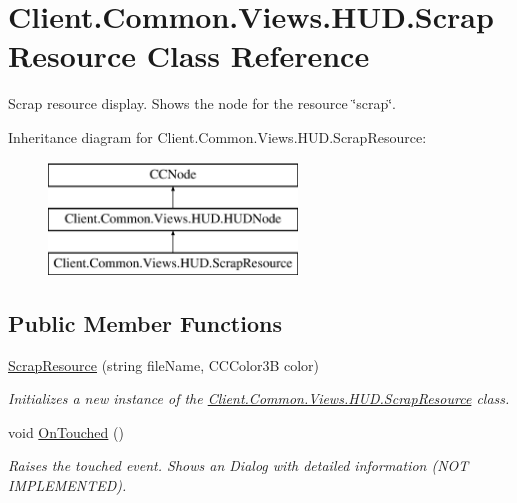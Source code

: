 \hypertarget{classClient_1_1Common_1_1Views_1_1HUD_1_1ScrapResource}{}\section{Client.\+Common.\+Views.\+H\+U\+D.\+Scrap\+Resource Class Reference}
\label{classClient_1_1Common_1_1Views_1_1HUD_1_1ScrapResource}


Scrap resource display. Shows the node for the resource \char`\"{}scrap\char`\"{}.  


Inheritance diagram for Client.\+Common.\+Views.\+H\+U\+D.\+Scrap\+Resource\+:\begin{figure}[H]
\begin{center}
\leavevmode
\includegraphics[height=3.000000cm]{classClient_1_1Common_1_1Views_1_1HUD_1_1ScrapResource}
\end{center}
\end{figure}
\subsection*{Public Member Functions}
\begin{DoxyCompactItemize}
\item 
\hyperlink{classClient_1_1Common_1_1Views_1_1HUD_1_1ScrapResource_a00f6583d31c22c9af3cfc16ceb9ebefd}{Scrap\+Resource} (string file\+Name, C\+C\+Color3\+B color)
\begin{DoxyCompactList}\small\item\em Initializes a new instance of the \hyperlink{classClient_1_1Common_1_1Views_1_1HUD_1_1ScrapResource}{Client.\+Common.\+Views.\+H\+U\+D.\+Scrap\+Resource} class. \end{DoxyCompactList}\item 
void \hyperlink{classClient_1_1Common_1_1Views_1_1HUD_1_1ScrapResource_a9de3fd81c2f56f19ebfd3c7b7daa2dcc}{On\+Touched} ()
\begin{DoxyCompactList}\small\item\em Raises the touched event. Shows an Dialog with detailed information (N\+O\+T I\+M\+P\+L\+E\+M\+E\+N\+T\+E\+D). \end{DoxyCompactList}\end{DoxyCompactItemize}
